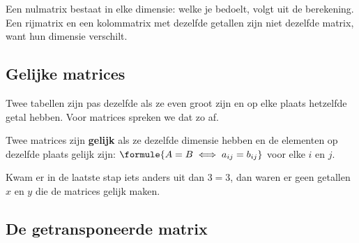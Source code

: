 Een nulmatrix bestaat in elke dimensie: welke je bedoelt, volgt uit de berekening. Een rijmatrix en een kolommatrix met dezelfde getallen zijn niet dezelfde matrix, want hun dimensie verschilt.

\subsection{Gelijke matrices}

Twee tabellen zijn pas dezelfde als ze even groot zijn en op elke plaats hetzelfde getal hebben. Voor matrices spreken we dat zo af.

\begin{theorie}
Twee matrices zijn \textbf{\textcolor{accent}{gelijk}} als ze dezelfde dimensie hebben en de elementen op dezelfde plaats gelijk zijn: \quad $\formule{A = B \iff a_{ij} = b_{ij}}$ voor elke $i$ en $j$.
\end{theorie}


Kwam er in de laatste stap iets anders uit dan $3 = 3$, dan waren er geen getallen $x$ en $y$ die de matrices gelijk maken.

\begin{oefeningen}
\end{oefeningen}

\subsection{De getransponeerde matrix}

